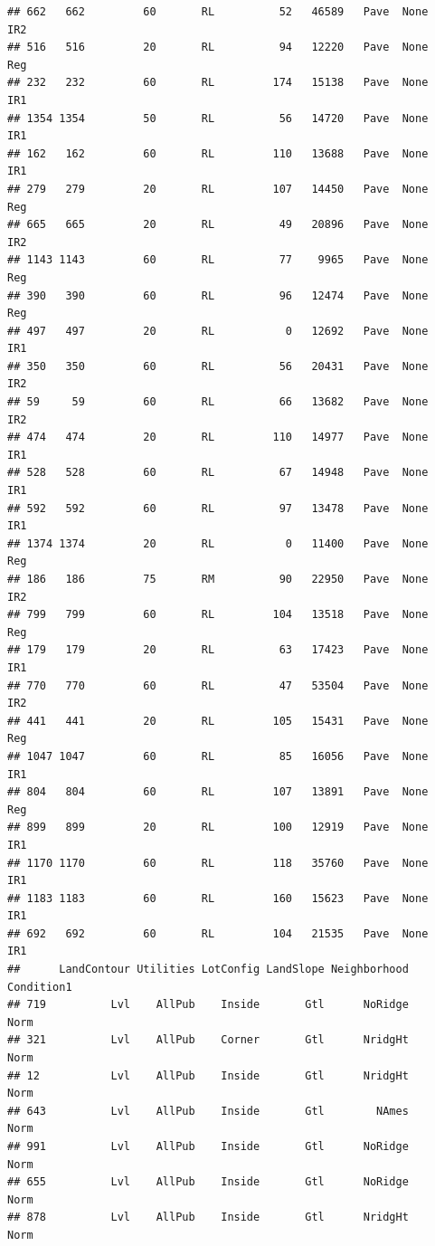 \documentclass[]{article}
\begin{document}
\begin{verbatim}
## 662   662         60       RL          52   46589   Pave  None      IR2
## 516   516         20       RL          94   12220   Pave  None      Reg
## 232   232         60       RL         174   15138   Pave  None      IR1
## 1354 1354         50       RL          56   14720   Pave  None      IR1
## 162   162         60       RL         110   13688   Pave  None      IR1
## 279   279         20       RL         107   14450   Pave  None      Reg
## 665   665         20       RL          49   20896   Pave  None      IR2
## 1143 1143         60       RL          77    9965   Pave  None      Reg
## 390   390         60       RL          96   12474   Pave  None      Reg
## 497   497         20       RL           0   12692   Pave  None      IR1
## 350   350         60       RL          56   20431   Pave  None      IR2
## 59     59         60       RL          66   13682   Pave  None      IR2
## 474   474         20       RL         110   14977   Pave  None      IR1
## 528   528         60       RL          67   14948   Pave  None      IR1
## 592   592         60       RL          97   13478   Pave  None      IR1
## 1374 1374         20       RL           0   11400   Pave  None      Reg
## 186   186         75       RM          90   22950   Pave  None      IR2
## 799   799         60       RL         104   13518   Pave  None      Reg
## 179   179         20       RL          63   17423   Pave  None      IR1
## 770   770         60       RL          47   53504   Pave  None      IR2
## 441   441         20       RL         105   15431   Pave  None      Reg
## 1047 1047         60       RL          85   16056   Pave  None      IR1
## 804   804         60       RL         107   13891   Pave  None      Reg
## 899   899         20       RL         100   12919   Pave  None      IR1
## 1170 1170         60       RL         118   35760   Pave  None      IR1
## 1183 1183         60       RL         160   15623   Pave  None      IR1
## 692   692         60       RL         104   21535   Pave  None      IR1
##      LandContour Utilities LotConfig LandSlope Neighborhood Condition1
## 719          Lvl    AllPub    Inside       Gtl      NoRidge       Norm
## 321          Lvl    AllPub    Corner       Gtl      NridgHt       Norm
## 12           Lvl    AllPub    Inside       Gtl      NridgHt       Norm
## 643          Lvl    AllPub    Inside       Gtl        NAmes       Norm
## 991          Lvl    AllPub    Inside       Gtl      NoRidge       Norm
## 655          Lvl    AllPub    Inside       Gtl      NoRidge       Norm
## 878          Lvl    AllPub    Inside       Gtl      NridgHt       Norm

\end{verbatim}
\end{document}
